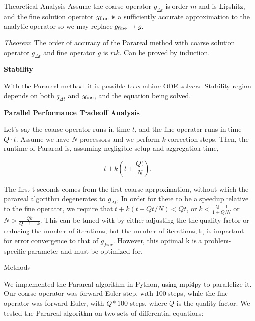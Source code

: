 \documentclass[final]{beamer}
\newlength{\onecolwid}
\begin{document}
\begin{frame}[t]
\begin{columns}[t]
\begin{column}{\onecolwid}
\begin{block}{Theoretical Analysis}
Assume the coarse operator $g_{\Delta t}$ is order $m$ and is Lipshitz, and the
fine solution operator $g_{\textnormal{fine}}$ is a sufficiently accurate
approximation to the analytic operator so we may replace $g_{\textnormal{fine}}
\to g$. 

\emph{Theorem}: The order of accuracy of the Parareal method with coarse
solution operator $g_{\Delta t}$ and fine operator $g$ is $mk$. Can be proved by
induction. 

\textbf{Stability}

With the Parareal method, it is possible to combine ODE solvers. Stability
region depends on both $g_{\Delta t}$ and $g_{\textnormal{fine}}$, and the
equation being solved. 

\textbf{Parallel Performance Tradeoff Analysis}

Let's say the coarse operator runs in time $t$, and the fine operator runs in
time $Q \cdot t$. Assume we have $N$ processors and we perform $k$ correction
steps. Then, the runtime of Parareal is, assuming negligible setup and
aggregation time,

\begin{equation}
t + k(t + \frac{Qt}{N}).
\end{equation}

The first t seconds comes from the first coarse aprpoximation, without which the parareal algorithm degenerates to $g_{\Delta t}$,  In order for there to be a speedup relative to the fine operator, we require
that $t + k(t + Qt/N) < Qt$, or $k < \frac{Q - 1}{1 + Q/N}$ or $N > \frac{Qk}{Q
- 1 - k}$. This can be tuned with by either adjusting the the quality factor or reducing the number of iterations, but the number of iterations, k, is important for error convergence to that of $g_{fine}$.  However, this optimal k is a problem-specific parameter and must be optimized for.

\end{block}


\begin{block}{Methods}

We implemented the Parareal algorithm in Python, using mpi4py to parallelize it.
Our coarse operator was forward Euler step, with 100 steps, while the fine
operator was forward Euler, with $Q * 100$ steps, where $Q$ is the quality
factor. We tested the Parareal algorithm on two sets of differential equations:


\end{block}
\end{column}
\end{columns}
\end{frame}
\end{document}
